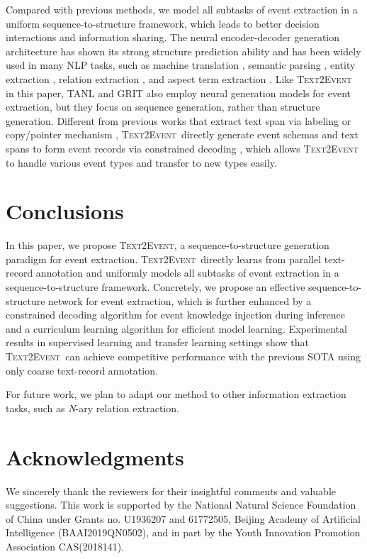 \documentclass[11pt,a4paper]{article}
\newcommand\modelname{\textsc{Text2Event}}
\begin{document}
Compared with previous methods, we model all subtasks of event extraction in a uniform sequence-to-structure framework, which leads to better decision interactions and information sharing.
The neural encoder-decoder generation architecture \citep{NIPS2014_a14ac55a,bahdanau2014neural} has shown its strong structure prediction ability and has been widely used in many NLP tasks, such as 
machine translation \citep{kalchbrenner-blunsom-2013-recurrent-continuous},
semantic parsing \citep{dong-lapata-2016-language,song-etal-2020-structural},
entity extraction \citep{strakova-etal-2019-neural},
relation extraction \citep{zeng-etal-2018-extracting,zhang-etal-2020-minimize},
and aspect term extraction \citep{ma-etal-2019-exploring}.
Like \modelname\, in this paper, TANL \citep{paolini2021structured} and GRIT \citep{du2020documentlevel} also employ  neural generation models for event extraction, but they focus on sequence generation, rather than structure generation.
Different from previous works that extract text span via labeling \cite{strakova-etal-2019-neural} or copy/pointer mechanism \cite{zeng-etal-2018-extracting,du2020documentlevel}, \modelname\, directly generate event schemas and text spans to form event records via constrained decoding \citep{decao2020autoregressive,chen-etal-2020-parallel}, which allows \modelname\, to handle various event types and transfer to new types easily.
 
\section{Conclusions} \label{sec:conclusion}

In this paper, we propose \modelname, a sequence-to-structure generation paradigm for event extraction.
\modelname\, directly learns from parallel text-record annotation and uniformly models all subtasks of event extraction in a sequence-to-structure framework.
Concretely, we propose an effective sequence-to-structure network for event extraction, which is further enhanced by a constrained decoding algorithm for event knowledge injection during inference and a curriculum learning algorithm for efficient model learning.
Experimental results in supervised learning and transfer learning settings show that \modelname\, can achieve competitive performance with the previous SOTA using only coarse text-record annotation.

For future work, we plan to adapt our method to other information extraction tasks, such as \textit{N}-ary relation extraction.
 
\section*{Acknowledgments}
We sincerely thank the reviewers for their insightful comments and valuable suggestions.
This work is supported by the National Natural Science Foundation of China under Grants no. U1936207 and 61772505,  Beijing Academy of Artiﬁcial Intelligence (BAAI2019QN0502), and in part by the Youth Innovation Promotion Association CAS(2018141).



\end{document}
